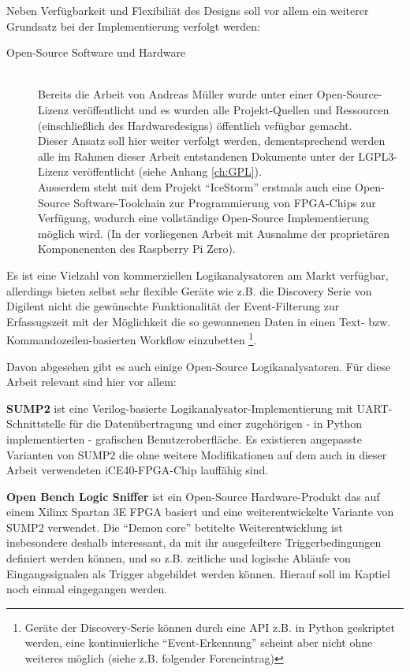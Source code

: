 Neben Verfügbarkeit und Flexibiliät des Designs soll vor allem ein weiterer Grundsatz bei der Implementierung verfolgt werden:
\begin{description}
\item[Open-Source Software und Hardware] \hfill \\
Bereits die Arbeit von Andreas Müller wurde unter einer Open-Source-Lizenz veröffentlicht und es wurden alle Projekt-Quellen und Ressourcen (einschließlich des Hardwaredesigns) öffentlich vefügbar gemacht.\\
Dieser Ansatz soll hier weiter verfolgt werden, dementsprechend werden alle im Rahmen dieser Arbeit entstandenen Dokumente unter der LGPL3-Lizenz veröffentlicht (siehe Anhang \ref{ch:GPL}).\\
Ausserdem steht mit dem Projekt ``IceStorm'' erstmals auch eine Open-Source Software-Toolchain zur Programmierung von FPGA-Chips zur Verfügung, wodurch eine vollständige Open-Source Implementierung möglich wird. (In der vorliegenen Arbeit mit Ausnahme der proprietären Komponenenten des Raspberry Pi Zero).     
\end{description}


Es ist eine Vielzahl von kommerziellen Logikanalysatoren am Markt verfügbar, allerdings bieten selbst sehr flexible Geräte wie z.B. die Discovery Serie von Digilent nicht die gewünschte Funktionalität der Event-Filterung zur Erfassugszeit mit der Möglichkeit die so gewonnenen Daten in einen Text- bzw. Kommandozeilen-basierten Workflow einzubetten \footnote{Geräte der Discovery-Serie können durch eine \acrshort{API} z.B. in Python geskriptet werden, eine kontinuierliche ``Event-Erkennung'' scheint aber nicht ohne weiteres möglich (siehe z.B. folgender Foreneintrag\cite{forum:digilent}) }. 

Davon abgesehen gibt es auch einige Open-Source Logikanalysatoren. Für diese Arbeit relevant sind hier vor allem:
\begin{description}
	\item \textbf{SUMP2} ist eine \gls{Verilog}-basierte Logikanalysator-Implementierung mit UART-Schnittstelle für die Datenübertragung und einer zugehörigen - in Python implementierten - grafischen Benutzeroberfläche. Es existieren angepasste Varianten von SUMP2 die ohne weitere Modifikationen auf dem auch in dieser Arbeit verwendeten iCE40-FPGA-Chip lauffähig sind\cite{web:blackmesa_sump2}.  
	\item \textbf{Open Bench Logic Sniffer} ist ein Open-Source Hardware-Produkt das auf einem Xilinx Spartan 3E FPGA basiert und eine weiterentwickelte Variante von SUMP2 verwendet. Die ``Demon core'' betitelte Weiterentwicklung ist insbesondere deshalb interessant, da mit ihr ausgefeiltere Triggerbedingungen definiert werden können, und so z.B. zeitliche und logische Abläufe von Eingangssignalen als Trigger abgebildet werden können. Hierauf soll im Kaptiel  noch einmal eingegangen werden.
\end{description}

